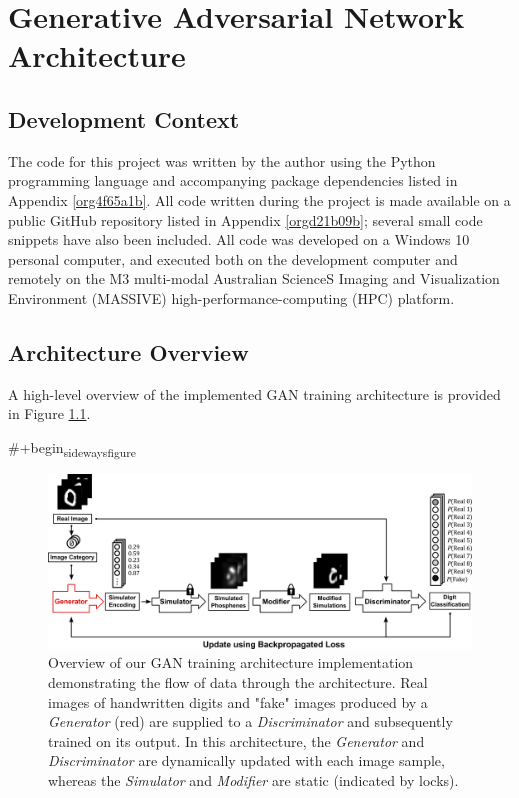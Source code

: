 \documentclass[a4paper,11pt,openany]{book}
\begin{document}
\chapter{Generative Adversarial Network Architecture}
\label{sec:org2215c34}
\section*{Development Context}
\label{sec:orgef7490b}

The code for this project was written by the author using the Python programming language and accompanying package dependencies listed in Appendix \ref{org4f65a1b}.
All code written during the project is made available on a public GitHub repository listed in Appendix \ref{orgd21b09b}; several small code snippets have also been included.
All code was developed on a Windows 10 personal computer, and executed both on the development computer and remotely on the M3 multi-modal Australian ScienceS Imaging and Visualization Environment (MASSIVE) high-performance-computing (HPC) platform. \cite{Goscinski2014}

\section*{Architecture Overview}
\label{sec:org59c255e}

A high-level overview of the implemented GAN training architecture is provided in Figure \ref{fig:orgf8a7f92}.

\#+begin\textsubscript{sidewaysfigure}
\begin{figure}[htbp]
\centering
\includegraphics[width=.9\linewidth]{images/methods_training_architecture.png}
\caption[Overview of GAN training architecture implementation]{\label{fig:orgf8a7f92}
Overview of our GAN training architecture implementation demonstrating the flow of data through the architecture. Real images of handwritten digits and "fake" images produced by a \emph{Generator} (red) are supplied to a \emph{Discriminator} and subsequently trained on its output. In this architecture, the \emph{Generator} and \emph{Discriminator} are dynamically updated with each image sample, whereas the \emph{Simulator} and \emph{Modifier} are static (indicated by locks).}
\end{figure}
\end{document}
